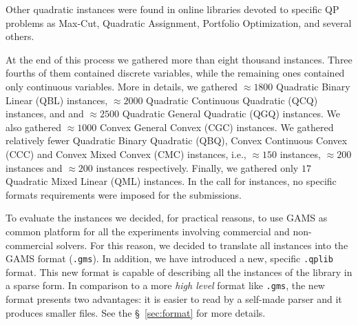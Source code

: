 Other quadratic instances were found in online libraries devoted to
specific QP problems as Max-Cut, Quadratic Assignment, Portfolio
Optimization, and several others.

At the end of this process we gathered more than eight thousand
instances. Three fourths of them contained discrete variables, while
the remaining ones contained only continuous variables. More in details,
we gathered $\approx 1800$ Quadratic Binary Linear (QBL) instances,
$\approx 2000$ Quadratic Continuous Quadratic (QCQ) instances, and
and $\approx 2500$ Quadratic General Quadratic (QGQ) instances. We
also gathered $\approx 1000$ Convex General Convex (CGC) instances. We
gathered relatively fewer Quadratic Binary Quadratic (QBQ), Convex
Continuous Convex (CCC) and Convex Mixed Convex (CMC) instances, i.e.,
$\approx 150$ instances, $\approx 200$ instances and $\approx 200$
instances respectively. Finally, we gathered only $17$ Quadratic Mixed
Linear (QML) instances. In the call for instances, no specific formats
requirements were imposed for the submissions.

To evaluate the instances we decided, for practical reasons, to use
GAMS as common platform for all the experiments involving commercial and
non-commercial solvers. For this reason, we decided to translate all
instances into the GAMS format (\texttt{.gms}). 
%
In addition, we have introduced a new, specific \texttt{.qplib} format. This
new format is capable of describing all the instances of the library in a sparse form.
In comparison to a more \emph{high level} format like \texttt{.gms}, the new
format presents two advantages: it is easier to read by a self-made parser and
it produces smaller files. See the \S~\ref{sec:format} for more details.



